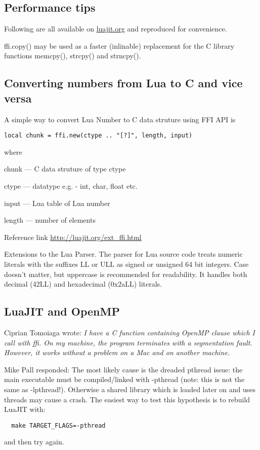 \subsection{Performance tips}
Following are all available on \url{luajit.org} and reproduced for convenience. 

\be
\item 
ffi.copy() may be used as a faster (inlinable) replacement
 for the C library functions memcpy(), strcpy() and strncpy().
\ee

\subsection{Converting numbers from Lua to C and vice versa}

A simple way to convert Lua Number to C data struture using FFI API is
\begin{verbatim}
local chunk = ffi.new(ctype .. "[?]", length, input)
\end{verbatim}
where
\be
\item 
\item chunk  ---  C data struture of type ctype
\item ctype  ---  datatype e.g. -  int, char, float etc.
\item input  ---  Lua table of Lua number
\item length ---  number of elements
\ee

Reference link \url{http://luajit.org/ext_ffi.html}

Extensions to the Lua Parser. 
The parser for Lua source code treats numeric literals with the suffixes LL
or ULL as signed or unsigned 64 bit integers. Case doesn't matter, but
uppercase is recommended for readability. It handles both decimal (42LL)
and hexadecimal (0x2aLL) literals.


\subsection{LuaJIT and OpenMP}

Ciprian Tomoiaga wrote:
{\it I have a C function containing OpenMP clause which I call with ffi. On my
machine, the program terminates with a segmentation fault. However, it
works without a problem on a Mac and on another machine. }

Mike Pall responded: 
The most likely cause is the dreaded pthread issue: the main
executable must be compiled/linked with -pthread (note: this is
not the same as -lpthread!). Otherwise a shared library which is
loaded later on and uses threads may cause a crash.
The easiest way to test this hypothesis is to rebuild LuaJIT with:
\begin{verbatim}
  make TARGET_FLAGS=-pthread
\end{verbatim}
and then try again.

